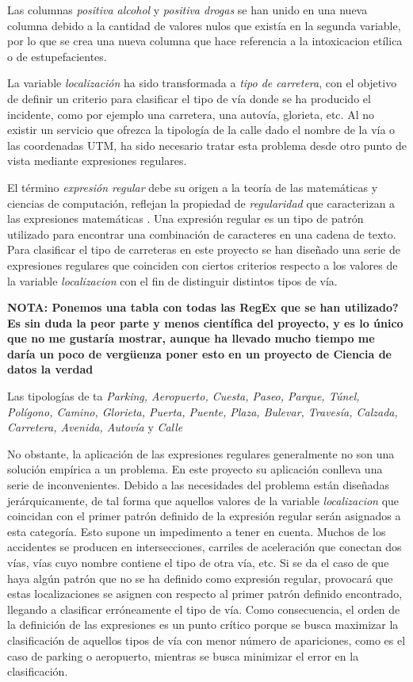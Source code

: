 \begin{enumerate}
                    Las columnas \textit{positiva alcohol} y \textit{positiva drogas} se han unido en una nueva columna debido a la cantidad de valores nulos que existía en la segunda variable, por lo que se crea una nueva columna que hace referencia a la intoxicacion etílica o de estupefacientes.
  

                    La variable \textit{localización} ha sido transformada a \textit{tipo de carretera}, con el objetivo de definir un criterio para clasificar el tipo de vía donde se ha producido el incidente, como por ejemplo una carretera, una autovía, glorieta, etc. Al no existir un servicio que ofrezca la tipología de la calle dado el nombre de la vía o las coordenadas UTM, ha sido necesario tratar esta problema desde otro punto de vista mediante expresiones regulares.

                    El término \textit{expresión regular} debe su origen a la teoría de las matemáticas y ciencias de computación, reflejan la propiedad de \textit{regularidad} que caracterizan a las expresiones matemáticas \cite{RegeXBook}. Una expresión regular es un tipo de patrón utilizado para encontrar una combinación de caracteres en una cadena de texto. Para clasificar el tipo de carreteras en este proyecto se han diseñado una serie de expresiones regulares que coinciden con ciertos criterios respecto a los valores de la variable \textit{localizacion} con el fin de distinguir distintos tipos de vía.


                    \textbf{NOTA: Ponemos una tabla con todas las RegEx que se han utilizado? Es sin duda la peor parte y menos científica del proyecto, y es lo único que no me gustaría mostrar, aunque ha llevado mucho tiempo me daría un poco de vergüenza poner esto en un proyecto de Ciencia de datos la verdad}


                    Las tipologías de ta \textit{Parking, Aeropuerto, Cuesta, Paseo, Parque, Túnel, Polígono, Camino, Glorieta, Puerta, Puente, Plaza, Bulevar, Travesía, Calzada, Carretera, Avenida, Autovía} y \textit{Calle}


                    No obstante, la aplicación de las expresiones regulares generalmente no son una solución empírica a un problema. En este proyecto su aplicación conlleva una serie de inconvenientes. Debido a las necesidades del problema están diseñadas jerárquicamente, de tal forma que aquellos valores de la variable \textit{localizacion} que coincidan con el primer patrón definido de la expresión regular serán asignados a esta categoría. Esto supone un impedimento a tener en cuenta. Muchos de los accidentes se producen en intersecciones, carriles de aceleración que conectan dos vías, vías cuyo nombre contiene el tipo de otra vía, etc. Si se da el caso de que haya algún patrón que no se ha definido como expresión regular, provocará que estas localizaciones se asignen con respecto al primer patrón definido encontrado, llegando a clasificar erróneamente el tipo de vía. Como consecuencia, el orden de la definición de las expresiones es un punto crítico porque se busca maximizar la clasificación de aquellos tipos de vía con menor número de apariciones, como es el caso de parking o aeropuerto, mientras se busca minimizar el error en la clasificación.



\end{enumerate}

